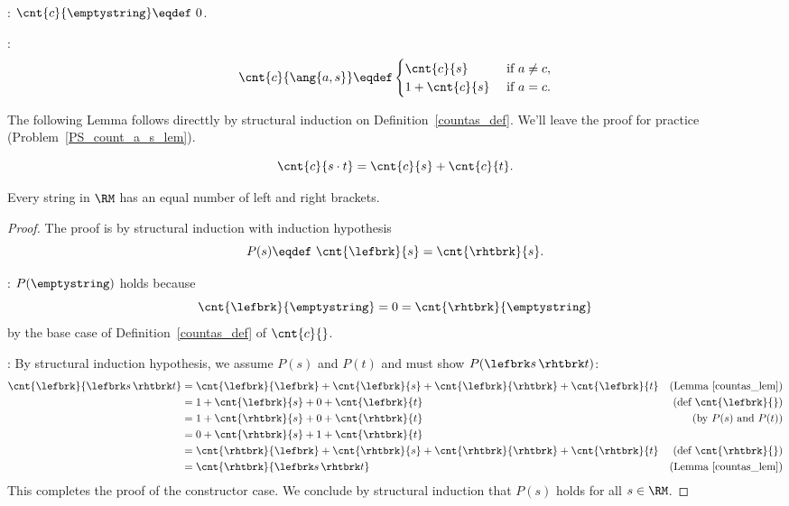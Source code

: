 \begin{definition}\label{countas_def} \mbox{}

: $\cnt{c}{\emptystring} \eqdef\ 0$.

:
\[
\cnt{c}{\ang{a,s}} \eqdef \begin{cases}
                           \cnt{c}{s}  &\text{ if } a \neq c,\\
                           1 + \cnt{c}{s} &\text{ if } a = c.
                           \end{cases}
\]
\end{definition}

The following Lemma follows directtly by structural induction on
Definition~\ref{countas_def}.  We'll leave the proof for practice
(Problem~\ref{PS_count_a_s_lem}).

\begin{lemma}\label{countas_lem}
\[
\cnt{c}{s \cdot t} = \cnt{c}{s} + \cnt{c}{t}.
\]
\end{lemma}

\begin{lemma*}
Every string in $\RM$ has an equal number of left and right brackets.

\begin{proof}
The proof is by structural induction with induction hypothesis
\[
P(s) \eqdef\  \cnt{\lefbrk}{s} = \cnt{\rhtbrk}{s}.
\]

: $P(\emptystring)$ holds because
\[
\cnt{\lefbrk}{\emptystring} = 0 = \cnt{\rhtbrk}{\emptystring}
\]
by the base case of Definition~\ref{countas_def} of $\cnt{c}{}$.

: By structural induction hypothesis, we assume
$P(s)$ and $P(t)$ and must show $P(\lefbrk s\,\rhtbrk t)$:
\begin{align*}
\cnt{\lefbrk}{\lefbrk s\,\rhtbrk t}
    & = \cnt{\lefbrk}{\lefbrk} + \cnt{\lefbrk}{s}
        +\cnt{\lefbrk}{\rhtbrk}+ \cnt{\lefbrk}{t}
         & \text{(Lemma~\ref{countas_lem})}\\
    & = 1 + \cnt{\lefbrk}{s} + 0 + \cnt{\lefbrk}{t}
         & \text{(def $\cnt{\lefbrk}{}$)}\\
    & = 1 + \cnt{\rhtbrk}{s} + 0 + \cnt{\rhtbrk}{t}
         & \text{(by $P(s)$ and $P(t)$)}\\
    & = 0 + \cnt{\rhtbrk}{s} + 1 + \cnt{\rhtbrk}{t}\\
    & = \cnt{\rhtbrk}{\lefbrk} + \cnt{\rhtbrk}{s}
        +\cnt{\rhtbrk}{\rhtbrk}+ \cnt{\rhtbrk}{t}
         & \text{(def $\cnt{\rhtbrk}{}$)}\\
    & = \cnt{\rhtbrk}{\lefbrk s\,\rhtbrk t}
            & \text{(Lemma~\ref{countas_lem})}
\end{align*}
This completes the proof of the constructor case.  We conclude by
structural induction that $P(s)$ holds for all $s \in\RM$.
\end{proof}
\end{lemma*}

